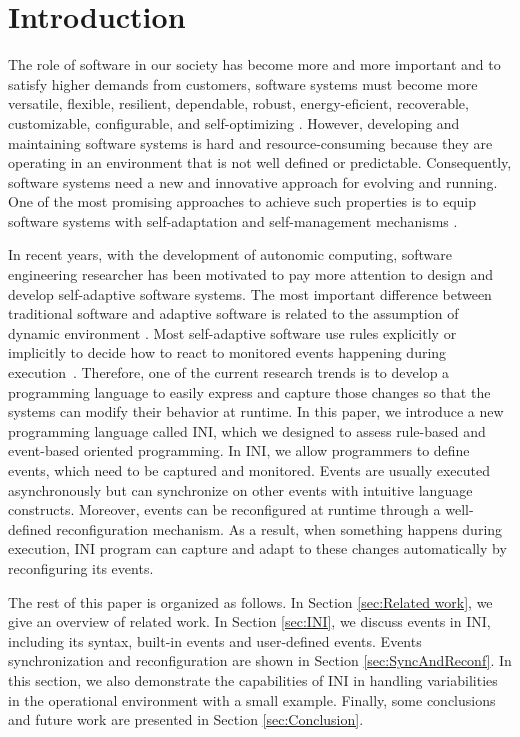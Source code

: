 \documentclass[runningheads,a4paper]{llncs}
\begin{document}
\section{Introduction}
The role of software in our society has become more and more important and to satisfy higher demands from customers, software systems must become more versatile, flexible, resilient, dependable, robust, energy-eficient, recoverable, customizable, configurable, and self-optimizing \cite{Cheng2009}. However, developing and maintaining software systems is hard and resource-consuming because they are operating in an environment that is not well defined or predictable. Consequently, software systems need a new and innovative approach for evolving and running. One of the most promising approaches to achieve such properties is to equip software systems with self-adaptation and self-management mechanisms \cite{Muller2009}.

In recent years, with the development of autonomic computing, software engineering researcher has been motivated to pay more attention to design and develop self-adaptive software systems. The most important difference between traditional software and adaptive software is related to the assumption of dynamic environment \cite{Yoo2007}. Most self-adaptive software use rules explicitly or implicitly to decide how to react to monitored events happening during execution~\cite{Wang2005}. Therefore, one of the current research trends is to develop a programming language to easily express and capture those changes so that the systems can modify their behavior at runtime. In this paper, we introduce a new programming language called INI, which we designed to assess rule-based and event-based oriented programming. In INI, we allow programmers to define events, which need to be captured and monitored. Events are usually executed asynchronously but can synchronize on other events with intuitive language constructs. Moreover, events can be reconfigured at runtime through a well-defined reconfiguration mechanism. As a result, when something happens during execution, INI program can capture and adapt to these changes automatically by reconfiguring its events.

The rest of this paper is organized as follows. In Section \ref{sec:Related work}, we give an overview of related work. In Section \ref{sec:INI}, we discuss events in INI, including its syntax, built-in events and user-defined events. Events synchronization and reconfiguration are shown in Section \ref{sec:SyncAndReconf}. In this section, we also demonstrate the capabilities of INI in handling variabilities in the operational environment with a small example. Finally, some conclusions and future work are presented in Section \ref{sec:Conclusion}.
\end{document}
